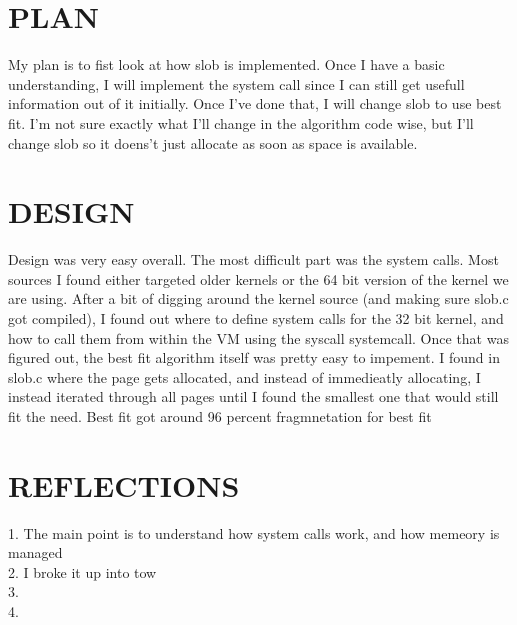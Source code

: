 \documentclass[letterpaper,10pt,titlepage]{article}
\begin{document}
\section{PLAN}
    My plan is to fist look at how slob is implemented. Once I have a basic understanding, I will implement the system call since I can still get usefull information out of it initially. Once I've done that, I will change slob to use best fit. I'm not sure exactly what I'll change in the algorithm code wise, but I'll change slob so it doens't just allocate as soon as space is available.   
 
\section{DESIGN}
    Design was very easy overall. The most difficult part was the system calls. Most sources I found either targeted older kernels or the 64 bit version of the kernel we are using. After a bit of digging around the kernel source (and making sure slob.c got compiled), I found out where to define system calls for the 32 bit kernel, and how to call them from within the VM using the syscall systemcall. Once that was figured out, the best fit algorithm itself was pretty easy to impement. I found in slob.c where the page gets allocated, and instead of immedieatly allocating, I instead iterated through all pages until I found the smallest one that would still fit the need. Best fit got around 96 percent fragmnetation for best fit


\section{REFLECTIONS}
    1. The main point is to understand how system calls work, and how memeory is managed\\
    2. I broke it up into tow \\
    3. \\
    4. \\ 


\end{document}
